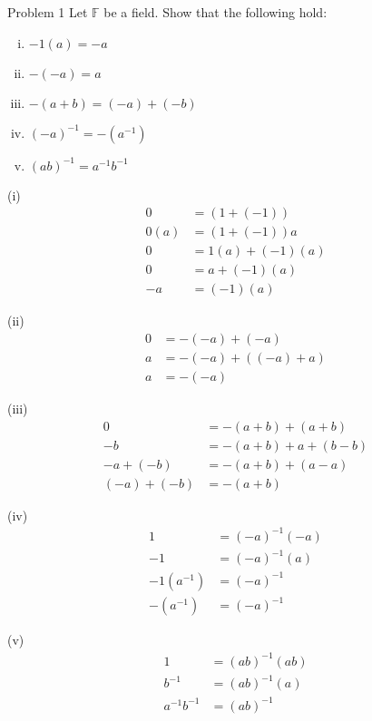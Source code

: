 \documentclass[10pt]{extarticle}
\title{}
\author{Avinash Iyer}
\date{}
\begin{document}
  \begin{problem}{Problem 1}
    Let $\mathbb{F}$ be a field. Show that the following hold:
    \begin{enumerate}[(i)]
      \item $-1(a) = -a$
      \item $-(-a) = a$
      \item $-(a+b) = (-a) + (-b)$
      \item $(-a)^{-1} = -(a^{-1})$
      \item $(ab)^{-1} = a^{-1}b^{-1}$
    \end{enumerate}
    \tcblower
    \begin{problem}{(i)}
      \begin{align*}
        0 &= (1 + (-1))\\
        0(a) &= (1 + (-1))a\\
        0 &= 1(a) + (-1)(a)\\
        0 &= a + (-1)(a)\\
        -a &= (-1)(a)
      \end{align*}
    \end{problem}
    \begin{problem}{(ii)}
      \begin{align*}
        0 &= -(-a) + (-a) \\
        a &= -(-a) + ((-a) + a)\\
        a &= -(-a)
      \end{align*}
    \end{problem}
    \begin{problem}{(iii)}
      \begin{align*}
        0 &= -(a+b) + (a+b)\\
        -b &= -(a+b) + a + (b-b)\\
        -a + (-b) &= -(a+b) + (a-a)\\
        (-a) + (-b) &= -(a+b)
      \end{align*}
    \end{problem}
    \begin{problem}{(iv)}
      \begin{align*}
        1 &= (-a)^{-1} (-a)\\
        -1 &= (-a)^{-1}(a)\\
        -1(a^{-1}) &= (-a)^{-1}\\
        -(a^{-1}) &= (-a)^{-1}
      \end{align*}
    \end{problem}
    \begin{problem}{(v)}
      \begin{align*}
        1 &= (ab)^{-1} (ab)\\
        b^{-1} &= (ab)^{-1} (a)\\
        a^{-1}b^{-1} &= (ab)^{-1}
      \end{align*}
    \end{problem}
  \end{problem}
\end{document}
